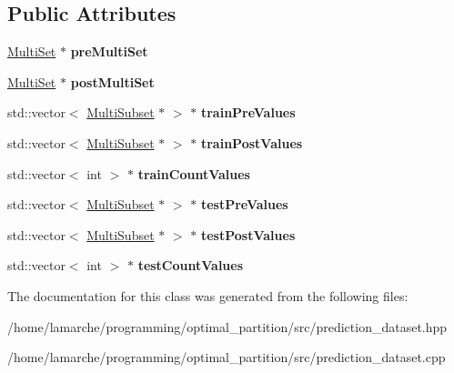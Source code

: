 \subsection*{Public Attributes}
\begin{DoxyCompactItemize}
\item 
\hypertarget{classPredictionDataset_a47b4d8ccf188271ce59ee481377a3c5f}{\hyperlink{classMultiSet}{Multi\-Set} $\ast$ {\bfseries pre\-Multi\-Set}}\label{classPredictionDataset_a47b4d8ccf188271ce59ee481377a3c5f}

\item 
\hypertarget{classPredictionDataset_a22343b4582412434376af66cb42d2d50}{\hyperlink{classMultiSet}{Multi\-Set} $\ast$ {\bfseries post\-Multi\-Set}}\label{classPredictionDataset_a22343b4582412434376af66cb42d2d50}

\item 
\hypertarget{classPredictionDataset_af09491db0c4267fa086bf640c4740483}{std\-::vector$<$ \hyperlink{classMultiSubset}{Multi\-Subset} $\ast$ $>$ $\ast$ {\bfseries train\-Pre\-Values}}\label{classPredictionDataset_af09491db0c4267fa086bf640c4740483}

\item 
\hypertarget{classPredictionDataset_a30e9419638339a7497f3d234780b2c20}{std\-::vector$<$ \hyperlink{classMultiSubset}{Multi\-Subset} $\ast$ $>$ $\ast$ {\bfseries train\-Post\-Values}}\label{classPredictionDataset_a30e9419638339a7497f3d234780b2c20}

\item 
\hypertarget{classPredictionDataset_af4fdcf7cfd236a99a73f18d630199291}{std\-::vector$<$ int $>$ $\ast$ {\bfseries train\-Count\-Values}}\label{classPredictionDataset_af4fdcf7cfd236a99a73f18d630199291}

\item 
\hypertarget{classPredictionDataset_a6ef1712f6f3e944cad7f966b123c44d4}{std\-::vector$<$ \hyperlink{classMultiSubset}{Multi\-Subset} $\ast$ $>$ $\ast$ {\bfseries test\-Pre\-Values}}\label{classPredictionDataset_a6ef1712f6f3e944cad7f966b123c44d4}

\item 
\hypertarget{classPredictionDataset_ab6ed50cd17878109b9a41ebb6db172ea}{std\-::vector$<$ \hyperlink{classMultiSubset}{Multi\-Subset} $\ast$ $>$ $\ast$ {\bfseries test\-Post\-Values}}\label{classPredictionDataset_ab6ed50cd17878109b9a41ebb6db172ea}

\item 
\hypertarget{classPredictionDataset_a7fe2eccbdae1cee136f5864b660c31ee}{std\-::vector$<$ int $>$ $\ast$ {\bfseries test\-Count\-Values}}\label{classPredictionDataset_a7fe2eccbdae1cee136f5864b660c31ee}

\end{DoxyCompactItemize}


The documentation for this class was generated from the following files\-:\begin{DoxyCompactItemize}
\item 
/home/lamarche/programming/optimal\-\_\-partition/src/prediction\-\_\-dataset.\-hpp\item 
/home/lamarche/programming/optimal\-\_\-partition/src/prediction\-\_\-dataset.\-cpp\end{DoxyCompactItemize}
